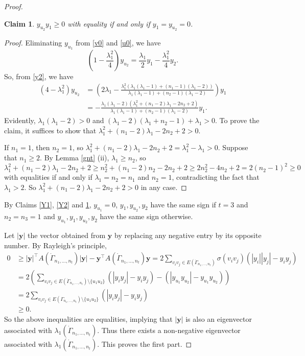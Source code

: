 \documentclass[10pt,a4paper]{amsart}
\numberwithin{equation}{section}
\newtheorem {Claim} {Claim}[section]
\begin{document}
\begin{proof}
\begin{Claim}\label{Y3}
$y_{u_2}y_1\ge 0$ with equality if and only if $y_1=y_{u_2}=0$. 
\end{Claim}

\begin{proof}
Eliminating $y_{u_1}$ from \eqref{v0} and \eqref{u0}, we have
\[
\left(1-\frac{\lambda_1^2}{4}\right)y_{u_2}=\frac{\lambda_1}{2}y_1-\frac{\lambda_1^2}{4}y_2.
\]
So, from \eqref{y2}, we have
\begin{align*}
\left(4-\lambda_1^2\right)y_{u_2}& =\left(2\lambda_1-\frac{\lambda_1^2\left(\lambda_1(\lambda_1-1)+(n_1-1)(\lambda_1-2)\right)}{\lambda_1(\lambda_1-1)+(n_2-1)(\lambda_1-2)}\right)y_1\\
& =-\frac{\lambda_1(\lambda_1-2)(\lambda_1^2+(n_1-2)\lambda_1-2n_2+2)}{\lambda_1(\lambda_1-1)+(n_2-1)(\lambda_1-2)}y_1.
\end{align*}
Evidently, $\lambda_1(\lambda_1-2)>0$ and $(\lambda_1-2)(\lambda_1+n_2-1)+\lambda_1>0$. To prove the claim, it suffices to show that $\lambda_1^2+(n_1-2)\lambda_1-2n_2+2>0$.

 If $n_1=1$, then $n_2=1$, so $\lambda_1^2+(n_1-2)\lambda_1-2n_2+2=\lambda_1^2-\lambda_1>0$. 
Suppose that $n_1\ge 2$. By Lemma \ref{gnt} (ii), $\lambda_1\ge n_2$, so
\[
\lambda_1^2+(n_1-2)\lambda_1-2n_2+2\ge n_2^2+(n_1-2)n_2-2n_2+2\ge 2n_2^2-4n_2+2=2(n_2-1)^2\ge 0  
\]
with equalities if and only if $\lambda_1=n_2=n_1$ and $n_2=1$, contradicting the fact that $\lambda_1>2$. So 
 $\lambda_1^2+(n_1-2)\lambda_1-2n_2+2>0$ in any case.
\end{proof}




By Claims \ref{Y1}, \ref{Y2} and \ref{Y3}, $y_{u_1}=0$, $y_1, y_{u_2}, y_2$ have the same sign if $t=3$ and $n_2=n_3=1$ and $y_{u_1}, y_1, y_{u_2}, y_2$ have the same sign otherwise. 


Let $|\mathbf{y}|$ the vector obtained from $\mathbf{y}$ by replacing any negative entry by its opposite number. 
By Rayleigh's principle, 
\begin{align*}
0 & \ge |\mathbf{y}|^\top A(\dot\Gamma_{n_1, \dots, n_t})|\mathbf{y}|-\mathbf{y}^\top A(\dot\Gamma_{n_1, \dots, n_t})\mathbf{y} = 2\sum_{v_iv_j\in E(\dot\Gamma_{n_1, \dots, n_t})}\sigma(v_iv_j)\left(|y_i||y_j|-y_iy_j\right)\\
& = 2\left(\sum_{v_iv_j\in E(\dot\Gamma_{n_1, \dots,  n_t})\setminus\{u_1u_2\}}\left(|y_iy_j|-y_iy_j\right)-\left(|y_{u_1}y_{u_2}|-y_{u_1}y_{u_2}\right)\right)\\
& =2\sum_{v_iv_j\in E(\Gamma_{n_1, \dots, n_t})\setminus\{u_1u_2\}}\left(|y_iy_j|-y_iy_j\right)\\
& \ge 0.
\end{align*}
So the above inequalities are equalities, implying that $|\mathbf{y}|$ is also an eigenvector associated with $\lambda_1(\dot\Gamma_{n_1, \dots, n_t})$. 
Thus there exists a non-negative eigenvector associated with $\lambda_1(\dot\Gamma_{n_1, \dots, n_t})$. This proves the first part.



\end{proof}
\end{document}

